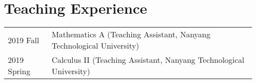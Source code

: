 \section{Teaching Experience}

\begin{tabular}{p{} p{}}
2019 Fall & Mathematics A (Teaching Assistant, Nanyang Technological University) \\
2019 Spring & Calculus II (Teaching Assistant, Nanyang Technological University) \\
\end{tabular}

